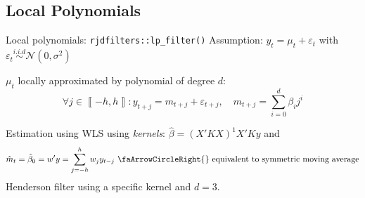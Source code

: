 \documentclass[10pt,xcolor=table,color={dvipsnames,usenames},ignorenonframetext,usepdftitle=false,english]{beamer}
\newcommand\1{\mathds{1}}
\begin{document}
\hypertarget{local-polynomials}{%
\subsection{Local Polynomials}\label{local-polynomials}}

\begin{frame}{Local polynomials: 
\texttt{rjdfilters::lp\_filter()}}
\protect\hypertarget{local-polynomials-rjdfilterslp_filter}{}
Assumption: \(y_t=\mu_t+\varepsilon_t\) with
\(\varepsilon_t\overset{i.i.d}{\sim}\mathcal N(0,\sigma^2)\)

\(\mu_t\) locally approximated by polynomial of degree \(d\): \[
\forall j\in\left\llbracket -h,h\right\rrbracket : y_{t+j}=m_{t+j}+\varepsilon_{t+j},\quad m_{t+j}=\sum_{i=0}^{d}\beta_{i}j^{i}
\]

\pause

Estimation using WLS using \emph{kernels}:
\(\hat{\beta}=(X'KX)^{1}X'Ky\) and \[
\hat{m}_{t}=\hat\beta_0=w'y=\sum_{j=-h}^{h}w_{j}y_{t-j}
\text{ \faArrowCircleRight{} equivalent to symmetric moving average}
\] \faArrowCircleRight{} Henderson filter using a specific kernel and
\(d=3\).
\end{frame}
\end{document}
